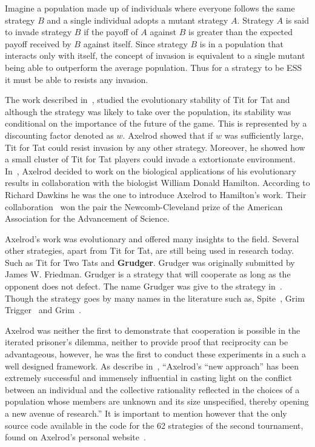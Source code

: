 \documentclass{article}
\theoremstyle{definition}
\begin{document}
Imagine a population made up of individuals where everyone follows the
same strategy \(B\) and a single individual adopts a mutant strategy \(A\).
Strategy \(A\) is said to invade strategy \(B\) if the payoff of \(A\) against \(B\)
is greater than the expected payoff received by \(B\) against itself.
Since strategy \(B\) is in a population that interacts only with itself,
the concept of invasion is equivalent to a single mutant being able to outperform
the average population. Thus for a strategy to be ESS it must be able to resists
any invasion.

The work described in~\cite{axelrod1981}, studied the evolutionary stability of
Tit for Tat and although the strategy was likely to take over the population, its
stability was conditional on the importance of the future of the game. This is
represented by a discounting factor denoted as \(w\). Axelrod showed that if \(w\)
was sufficiently large, Tit for Tat could resist invasion by any other strategy.
Moreover, he showed how a small cluster of Tit for Tat players could invade a extortionate
environment.
In~\cite{Axelrod1984}, Axelrod decided to work on the biological applications of
his evolutionary results in collaboration with the biologist William Donald Hamilton.
According to Richard Dawkins he was the one to introduce Axelrod to Hamilton's work.
Their collaboration~\cite{Axelrod1984} won the pair the Newcomb-Cleveland prize
of the American Association for the Advancement of Science.

Axelrod's work was evolutionary and offered many insights to the field. Several
other strategies, apart from Tit for Tat, are still being
used in research today. Such as Tit for Two Tats and \textbf{Grudger}.
Grudger was originally submitted by James W. Friedman. Grudger is a strategy that
will cooperate as long as the opponent does not defect. The name Grudger was give
to the strategy in~\cite{Li2014}. Though the strategy goes by many names in the
literature such as, Spite~\cite{Beaufils1997}, Grim Trigger~\cite{Banks1990} and
Grim~\cite{Van2015}.

Axelrod was neither the first to demonstrate that cooperation is possible
in the iterated prisoner's dilemma, neither to provide proof that reciprocity can
be advantageous, however, he was the first to conduct these experiments
in a such a well designed framework. As describe in~\cite{Rapoport2015},
``Axelrod's “new approach” has been extremely successful and immensely
influential in casting light on the conflict between an individual and the collective
rationality reflected in the choices of a population whose members are unknown
and its size unspecified, thereby opening a new avenue of research.''
It is important to mention however that the only source code available in the code
for the 62 strategies of the second tournament, found on Axelrod's personal
website~\cite{fortan_code}.
\end{document}
